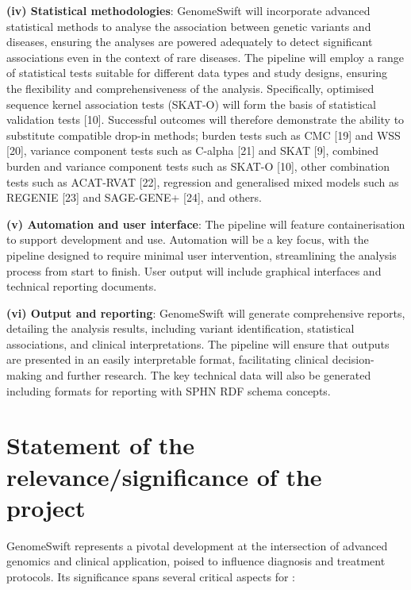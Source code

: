 \textbf{(iv) Statistical methodologies}: GenomeSwift will incorporate
advanced statistical methods to analyse the association between genetic
variants and diseases, ensuring the analyses are powered adequately to
detect significant associations even in the context of rare diseases.
The pipeline will employ a range of statistical tests suitable for
different data types and study designs, ensuring the flexibility and
comprehensiveness of the analysis. Specifically, optimised sequence
kernel association tests (SKAT-O) will form the basis of statistical
validation tests {[}10{]}. Successful outcomes will therefore
demonstrate the ability to substitute compatible drop-in methods; burden
tests such as CMC {[}19{]} and WSS {[}20{]}, variance component tests
such as C-alpha {[}21{]} and SKAT {[}9{]}, combined burden and variance
component tests such as SKAT-O {[}10{]}, other combination tests such as
ACAT-RVAT {[}22{]}, regression and generalised mixed models such as
REGENIE {[}23{]} and SAGE-GENE+ {[}24{]}, and others.

\textbf{(v) Automation and user interface}: The pipeline will feature
containerisation to support development and use. Automation will be a
key focus, with the pipeline designed to require minimal user
intervention, streamlining the analysis process from start to finish.
User output will include graphical interfaces and technical reporting
documents.

\textbf{(vi) Output and reporting}: GenomeSwift will generate
comprehensive reports, detailing the analysis results, including variant
identification, statistical associations, and clinical interpretations.
The pipeline will ensure that outputs are presented in an easily
interpretable format, facilitating clinical decision-making and further
research. The key technical data will also be generated including
formats for reporting with SPHN RDF schema concepts.

\hypertarget{statement-of-the-relevancesignificance-of-the-project}{%
\section{Statement of the relevance/significance of the
project}\label{statement-of-the-relevancesignificance-of-the-project}}

GenomeSwift represents a pivotal development at the intersection of
advanced genomics and clinical application, poised to influence
diagnosis and treatment protocols. Its significance spans several
critical aspects for \kispi:

